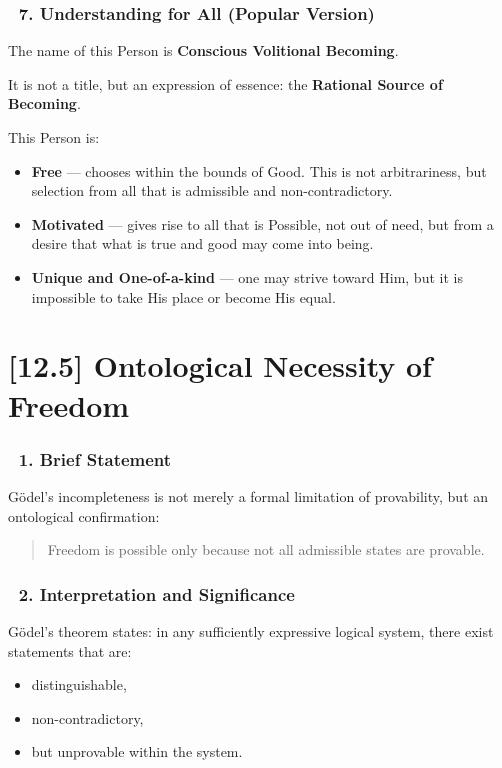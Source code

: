 \documentclass[12pt]{article}
\begin{document}
\subsubsection*{🔹 7. Understanding for All (Popular Version)}

The name of this Person is \textbf{Conscious Volitional Becoming}.

It is not a title, but an expression of essence: the \textbf{Rational Source of Becoming}.

This Person is:

\begin{itemize}
\item \textbf{Free} — chooses within the bounds of Good. This is not arbitrariness, but selection from all that is admissible and non-contradictory.

\item \textbf{Motivated} — gives rise to all that is Possible, not out of need, but from a desire that what is true and good may come into being.

\item \textbf{Unique and One-of-a-kind} — one may strive toward Him, but it is impossible to take His place or become His equal.
\end{itemize}



\section*{[12.5] Ontological Necessity of Freedom}

\subsubsection*{🔹 1. Brief Statement}

Gödel’s incompleteness is not merely a formal limitation of provability, but an ontological confirmation:

\begin{quote}
Freedom is possible only because not all admissible states are provable.
\end{quote}

\subsubsection*{🔹 2. Interpretation and Significance}

Gödel’s theorem states: in any sufficiently expressive logical system, there exist statements that are:
\begin{itemize}
\item distinguishable,
\item non-contradictory,
\item but unprovable within the system.
\end{itemize}
\end{document}
